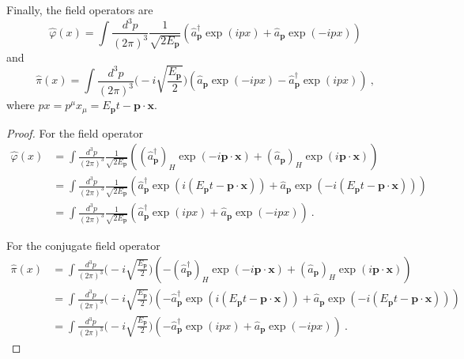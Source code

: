     Finally, the field operators are 
    \begin{equation*}
        \hat \varphi (x) = \int \frac{d^3 p}{(2\pi)^3} \frac{1}{\sqrt{2 E_{\mathbf p}}} (\hat a^\dagger_{\mathbf p} \exp(i p x) + \hat a_{\mathbf p} \exp(-i p x))
    \end{equation*}
    and 
    \begin{equation*}
        \hat \pi (x) = \int \frac{d^3 p}{(2\pi)^3} \Big (- i \sqrt{\frac{ E_{\mathbf p}}{2}} \Big ) (\hat a_{\mathbf p} \exp(-i p x) - \hat a^\dagger_{\mathbf p} \exp(i p x) ) ~,
    \end{equation*}
    where $p x = p^\mu x_\mu = E_{\mathbf p} t - \mathbf p \cdot \mathbf x$. 
    \begin{proof}
        For the field operator 
        \begin{equation}
        \begin{aligned}
            \hat \varphi (x) & = \int \frac{d^3 p}{(2\pi)^3} \frac{1}{\sqrt{2 E_{\mathbf p}}} ((\hat a^\dagger_{\mathbf p})_H \exp(-i \mathbf p \cdot \mathbf x) + (\hat a_{\mathbf p})_H \exp(i \mathbf p \cdot \mathbf x)) \\ & = \int \frac{d^3 p}{(2\pi)^3} \frac{1}{\sqrt{2 E_{\mathbf p}}} (\hat a^\dagger_{\mathbf p} \exp(i (E_{\mathbf p} t - \mathbf p \cdot \mathbf x)) + \hat a_{\mathbf p} \exp(-i (E_{\mathbf p} t - \mathbf p \cdot \mathbf x))) \\ & = \int \frac{d^3 p}{(2\pi)^3} \frac{1}{\sqrt{2 E_{\mathbf p}}} (\hat a^\dagger_{\mathbf p} \exp(i px) + \hat a_{\mathbf p} \exp(-i px)) ~.
        \end{aligned}
        \end{equation}

        For the conjugate field operator 
        \begin{equation}
        \begin{aligned}
            \hat \pi (x) & = \int \frac{d^3 p}{(2\pi)^3} \Big (- i \sqrt{\frac{ E_{\mathbf p}}{2}} \Big ) (- (\hat a^\dagger_{\mathbf p})_H \exp(-i \mathbf p \cdot \mathbf x) + (\hat a_{\mathbf p})_H \exp(i \mathbf p \cdot \mathbf x)) \\ & = \int \frac{d^3 p}{(2\pi)^3} \Big (- i \sqrt{\frac{ E_{\mathbf p}}{2}} \Big ) (- \hat a^\dagger_{\mathbf p} \exp(i (E_{\mathbf p} t - \mathbf p \cdot \mathbf x)) + \hat a_{\mathbf p} \exp(-i (E_{\mathbf p} t - \mathbf p \cdot \mathbf x))) \\ & = \int \frac{d^3 p}{(2\pi)^3} \Big (- i \sqrt{\frac{ E_{\mathbf p}}{2}} \Big ) ( - \hat a^\dagger_{\mathbf p} \exp(i px) + \hat a_{\mathbf p} \exp(-i px)) ~.
        \end{aligned}
        \end{equation}
    \end{proof}

